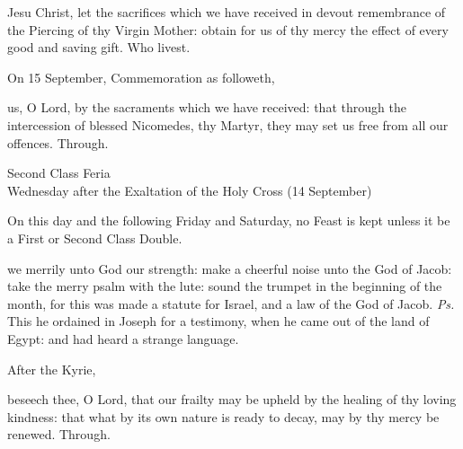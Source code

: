 \postcommunion
{} Jesu Christ, let the sacrifices which we have received in devout remembrance of the Piercing of thy Virgin Mother: obtain for us of thy mercy the effect of every good and saving gift. Who livest.

\begin{rubric}
	 On 15 September, Commemoration  as followeth,
\end{rubric}
 us, O Lord, by the sacraments which we have received: that through the intercession of blessed Nicomedes, thy Martyr, they may set us free from all our offences. Through.


\clearpage
{}

\begin{inhead}
    {Second Class Feria\\
Wednesday after the Exaltation of the Holy Cross (14 September)}
\end{inhead}
\begin{rubric}
	On this day and the following Friday and Saturday, no Feast is kept unless it be a First or Second Class Double.
\end{rubric}

\introit
{} we merrily unto God our strength: make a cheerful noise unto the God of Jacob: take the merry psalm with the lute: sound the trumpet in the beginning of the month, for this was made a statute for Israel, and a law of the God of Jacob. \textit{Ps.} This he ordained in Joseph for a testimony, when he came out of the land of Egypt: and had heard a strange language.
\begin{rubric}
    After the Kyrie,
\end{rubric}

\collect
{} beseech thee, O Lord, that our frailty may be upheld by the healing of thy loving kindness: that what by its own nature is ready to decay, may by thy mercy be renewed. Through.

